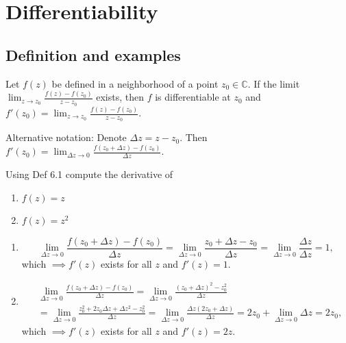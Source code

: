 \section{Differentiability}

\subsection{Definition and examples}

\begin{definition}\label{definition:6.1}
Let $f(z)$ be defined in a neighborhood of a point $z_0 \in \mathbb{C}$. If the limit $\lim_{z \to z_0} \frac{f(z) - f(z_0)}{z - z_0}$ exists, then $f$ is differentiable at $z_0$ and $f'(z_0) = \lim_{z \to z_0} \frac{f(z) - f(z_0)}{z - z_0}$.
\end{definition}

Alternative notation: Denote $\Delta z = z - z_0$. Then $f'(z_0) = \lim_{\Delta z \to 0} \frac{f(z_0 + \Delta z) - f(z_0)}{\Delta z}$.

\begin{example}\label{example:8.1} Using Def 6.1 compute the derivative of
    \begin{enumerate}[label=\alph*)]
        \item $f(z) = z$
        \item $f(z) = z^2$
    \end{enumerate}

\end{example}
\begin{soln}
      \begin{enumerate}[label=\alph*)]
    \item \[ \lim_{\Delta z \to 0} \frac{f(z_0 + \Delta z) - f(z_0)}{\Delta z} = \lim_{\Delta z \to 0} \frac{z_0 + \Delta z - z_0}{\Delta z} = \lim_{\Delta z \to 0} \frac{\Delta z}{\Delta z} = 1, \] which $\implies f'(z)$ exists for all $z$ and $f'(z) = 1$.
    \item \begin{align*}    & \lim_{\Delta z \to 0} \frac{f(z_0 + \Delta z) - f(z_0)}{\Delta z} = \lim_{\Delta z \to 0} \frac{(z_0 + \Delta z)^2 - z_0^2}{\Delta z}\\ 
                            & = \lim_{\Delta z \to 0} \frac{z_0^2 + 2z_0 \Delta z + \Delta z^2 - z_0^2}{\Delta z} = \lim_{\Delta z \to 0} \frac{\Delta z(2z_0 + \Delta z)}{\Delta z} = 2z_0 + \lim_{\Delta z \to 0} \Delta z = 2z_0, \end{align*} 
    which $ \implies f'(z)$ exists for all $z$ and $f'(z) = 2z$.
\end{enumerate}
    
\end{soln}


